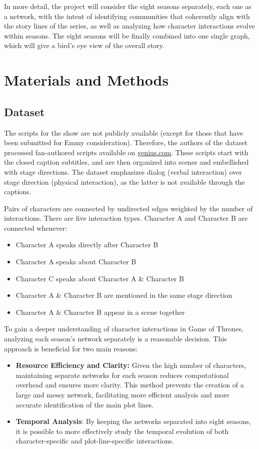\documentclass[10pt,twocolumn,letterpaper]{article}
\begin{document}
In more detail, the project will consider the eight seasons separately, each one as a network, with the intent of identifying communities that coherently align with the story lines\cite{wikiofwesteros} of the series, as well as analyzing how character interactions evolve within seasons. The eight seasons will be finally combined into one single graph, which will give a bird's eye view of the overall story.

\section{Materials and Methods}

\subsection{Dataset}

The scripts for the show are not publicly available (except for those that have been submitted for Emmy consideration). Therefore, the authors\cite{bookchapter} of the dataset\cite{dataset} processed fan-authored scripts available on \url{genius.com}. These scripts start with the closed caption subtitles, and are then organized into scenes and embellished with stage directions. The dataset emphasizes dialog (verbal interaction) over stage direction (physical interaction), as the latter is not available through the captions. 

Pairs of characters are connected by undirected edges weighted by the number of interactions. There are five interaction types. Character A and Character B are connected whenever:
\begin{itemize}
    \item Character A speaks directly after Character B
    \item Character A speaks about Character B
    \item Character C speaks about Character A \& Character B
    \item Character A \& Character B are mentioned in the same stage direction
    \item Character A \& Character B appear in a scene together
\end{itemize}


To gain a deeper understanding of character interactions in Game of Thrones, analyzing each season's network separately is a reasonable decision. This approach is beneficial for two main reasons:

\begin{itemize}
    \item \textbf{Resource Efficiency and Clarity:} Given the high number of characters, maintaining separate networks for each season reduces computational overhead and ensures more clarity. This method prevents the creation of a large and messy network, facilitating more efficient analysis and more accurate identification of the main plot lines.

    \item \textbf{Temporal Analysis}: By keeping the networks separated into eight seasons, it is possible to more effectively study the temporal evolution of both character-specific and plot-line-specific interactions.
\end{itemize}
\end{document}
